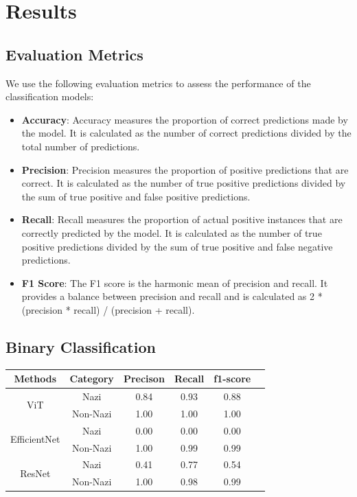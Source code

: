 \documentclass[11pt,a4paper,onecolumn]{article}
\begin{document}
\section{Results}

\subsection{Evaluation Metrics}

We use the following evaluation metrics to assess the performance of the classification models:
\begin{itemize}
  \item \textbf{Accuracy}: Accuracy measures the proportion of correct
    predictions made by the model. It is calculated as the number of
    correct predictions divided by the total number of predictions.
  \item \textbf{Precision}: Precision measures the proportion of
    positive predictions that are correct. It is calculated as the
    number of true positive predictions divided by the sum of true
    positive and false positive predictions.
  \item \textbf{Recall}: Recall measures the proportion of actual
    positive instances that are correctly predicted by the model. It
    is calculated as the number of true positive predictions divided
    by the sum of true positive and false negative predictions.
  \item \textbf{F1 Score}: The F1 score is the harmonic mean of
    precision and recall. It provides a balance between precision and
    recall and is calculated as 2 * (precision * recall) / (precision + recall).
\end{itemize}

\subsection{Binary Classification}

    \begin{tabular}{|c|c|c|c|c|c|}
      \hline
      Methods & Category & Precison & Recall & f1-score \\\hline\hline

      \multirow{2}{*}{ViT} & Nazi & 0.84 & 0.93 & 0.88 \\\cline{2-6}
      & Non-Nazi & 1.00 & 1.00 & 1.00 \\\hline

      \multirow{2}{*}{EfficientNet} & Nazi & 0.00 & 0.00 & 0.00 \\\cline{2-6}
      & Non-Nazi & 1.00 & 0.99 & 0.99 \\\hline

      \multirow{2}{*}{ResNet} & Nazi & 0.41 & 0.77 & 0.54 \\\cline{2-6}
      & Non-Nazi & 1.00 & 0.98 & 0.99 \\\hline



    \end{tabular}
\end{document}
